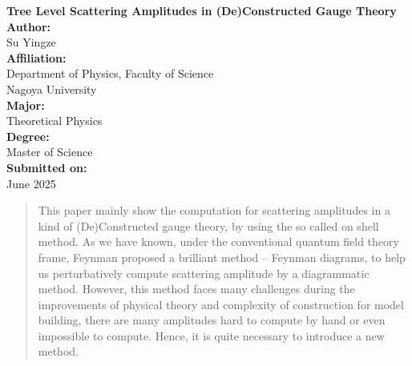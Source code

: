\documentclass[12pt]{article}
\numberwithin{equation}{section}
\begin{document}
\begin{titlepage}
    \centering
    \vspace*{2cm}

    {\LARGE \textbf{Tree Level Scattering Amplitudes in (De)Constructed Gauge Theory}}\\[1.5cm]

    \textbf{Author:} \\
    {\Large Su Yingze} \\[1cm]

    \textbf{Affiliation:} \\
    Department of Physics, Faculty of Science \\
    Nagoya University \\[1cm]

    \textbf{Major:} \\
    Theoretical Physics \\[1cm]

    \textbf{Degree:} \\
    Master of Science \\[1cm]

    \textbf{Submitted on:} \\
    June 2025 \\[2cm]

    \vfill
\end{titlepage}
\newpage
\begin{abstract}
\normalsize
This paper mainly show the computation for scattering amplitudes in a kind of (De)Constructed gauge theory, by using the so called on shell method. As we have known,
under the conventional quantum field theory frame, Feynman proposed a brilliant method -- Feynman diagrams, to help us perturbatively compute scattering amplitude by a
diagrammatic method. However, this method faces many challenges during the improvements of physical theory and complexity of construction for model building, there are many
amplitudes hard to compute by hand or even impossible to compute. Hence, it is quite necessary to introduce a new method.      
\end{abstract}
\newpage
\tableofcontents
\newpage
\end{document}

